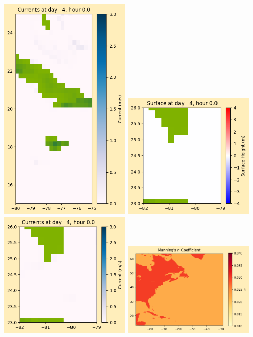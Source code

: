\documentclass[11pt]{article}
\begin{document}
\includegraphics[width=0.475\textwidth]{frame0028fig1008.png}
\vskip 10pt 
\includegraphics[width=0.475\textwidth]{frame0028fig1009.png}
\includegraphics[width=0.475\textwidth]{frame0028fig1010.png}
\vskip 10pt 
\includegraphics[width=0.475\textwidth]{frame0028fig1011.png}
\end{document}

